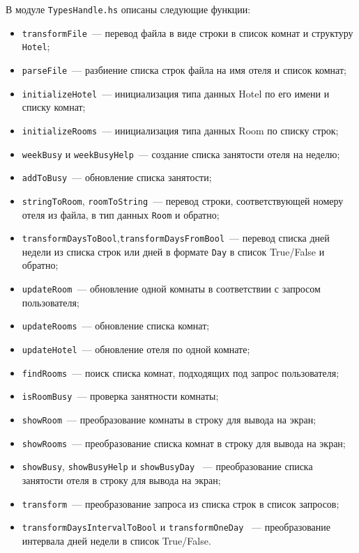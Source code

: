 \documentclass[oneside,final,14pt]{extarticle}
\begin{document}
В модуле \texttt{TypesHandle.hs} описаны следующие функции:
\begin{itemize}
    \item \texttt{transformFile}~--- перевод файла в виде строки в 
    список комнат и структуру \texttt{Hotel};
    \item \texttt{parseFile}~--- разбиение списка строк файла на имя отеля 
    и список комнат;
    \item \texttt{initializeHotel}~--- инициализация типа данных Hotel по его 
    имени и списку комнат;
    \item \texttt{initializeRooms}~--- инициализация типа данных Room по списку 
    строк;
    \item \texttt{weekBusy} и \texttt{weekBusyHelp}~--- создание списка занятости 
    отеля на неделю;
    \item \texttt{addToBusy}~--- обновление списка занятости;
    \item \texttt{stringToRoom}, \texttt{roomToString}~--- перевод строки, 
    соответствующей номеру отеля из файла, в тип данных \texttt{Room} 
    и обратно;
    \item \texttt{transformDaysToBool},\texttt{transformDaysFromBool}~--- 
    перевод списка дней недели из списка строк или дней в формате 
    \texttt{Day} в список True/False и обратно;
    \item \texttt{updateRoom}~--- обновление одной комнаты в соответствии 
    с запросом пользователя;
    \item \texttt{updateRooms}~--- обновление списка комнат;
    \item \texttt{updateHotel}~--- обновление отеля по одной комнате;
    \item \texttt{findRooms}~--- поиск списка комнат, подходящих под 
    запрос пользователя;
    \item \texttt{isRoomBusy}~--- проверка занятности комнаты;
    \item \texttt{showRoom}~--- преобразование комнаты в строку 
    для вывода на экран;
    \item \texttt{showRooms}~--- преобразование списка комнат в строку 
    для вывода на экран;
    \item \texttt{showBusy}, \texttt{showBusyHelp} и \texttt{showBusyDay}
    ~--- преобразование списка занятости отеля в строку для вывода на экран;
    \item \texttt{transform}~--- преобразование запроса из списка строк
    в список запросов;
    \item \texttt{transformDaysIntervalToBool} и \texttt{transformOneDay}
    ~--- преобразование интервала дней недели в список True/False. 
\end{itemize}
\end{document}
